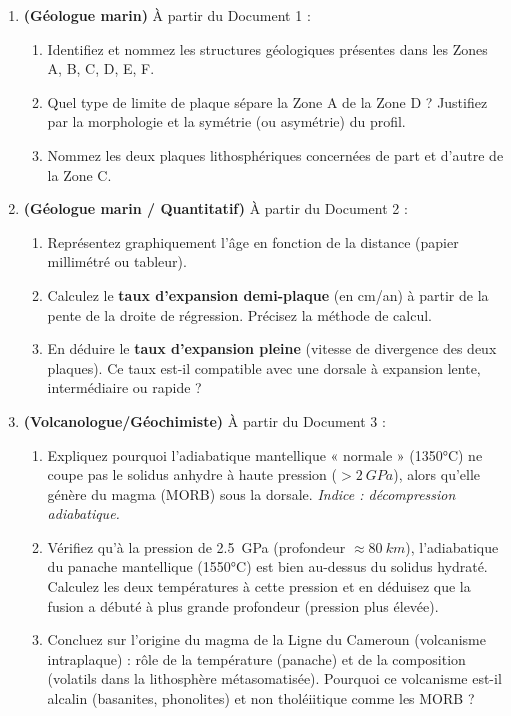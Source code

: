 \documentclass[11pt]{article}
\begin{document}
\begin{enumerate}
    \item \textbf{(Géologue marin)} À partir du Document 1 :
    \begin{enumerate}
        \item Identifiez et nommez les structures géologiques présentes dans les Zones A, B, C, D, E, F.
        \item Quel type de limite de plaque sépare la Zone A de la Zone D ? Justifiez par la morphologie et la symétrie (ou asymétrie) du profil.
        \item Nommez les deux plaques lithosphériques concernées de part et d'autre de la Zone C.
    \end{enumerate}
    \item \textbf{(Géologue marin / Quantitatif)} À partir du Document 2 :
    \begin{enumerate}
        \item Représentez graphiquement l'âge en fonction de la distance (papier millimétré ou tableur).
        \item Calculez le \textbf{taux d'expansion demi-plaque} (en cm/an) à partir de la pente de la droite de régression. Précisez la méthode de calcul.
        \item En déduire le \textbf{taux d'expansion pleine} (vitesse de divergence des deux plaques). Ce taux est-il compatible avec une dorsale à expansion lente, intermédiaire ou rapide ?
    \end{enumerate}
    \item \textbf{(Volcanologue/Géochimiste)} À partir du Document 3 :
    \begin{enumerate}
        \item Expliquez pourquoi l'adiabatique mantellique « normale » (1350°C) ne coupe pas le solidus anhydre à haute pression ($> \SI{2}{GPa}$), alors qu'elle génère du magma (MORB) sous la dorsale. \textit{Indice : décompression adiabatique.}
        \item Vérifiez qu'à la pression de \SI{2,5}{GPa} (profondeur $\approx \SI{80}{km}$), l'adiabatique du panache mantellique (1550°C) est bien au-dessus du solidus hydraté. Calculez les deux températures à cette pression et en déduisez que la fusion a débuté à plus grande profondeur (pression plus élevée).
        \item Concluez sur l'origine du magma de la Ligne du Cameroun (volcanisme intraplaque) : rôle de la température (panache) et de la composition (volatils dans la lithosphère métasomatisée). Pourquoi ce volcanisme est-il alcalin (basanites, phonolites) et non tholéiitique comme les MORB ?

\end{enumerate}
\end{enumerate}
\end{document}

